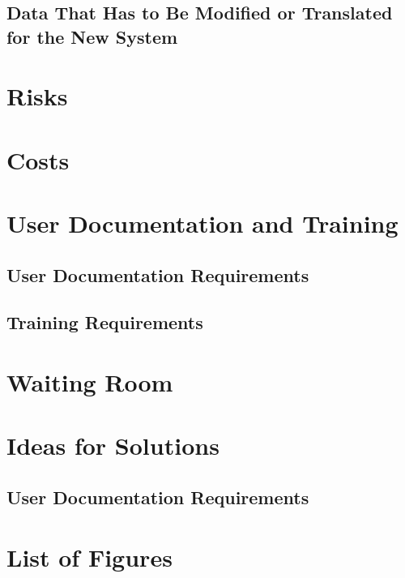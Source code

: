 \documentclass{article}
\begin{document}
\subsection{Data That Has to Be Modified or Translated for the New System}


\section{Risks}

\section{Costs}

\section{User Documentation and Training}

\subsection{User Documentation Requirements}


\subsection{Training Requirements}


\section{Waiting Room}


\section{Ideas for Solutions}

\subsection{User Documentation Requirements}


\section*{List of Figures}
\end{document}
